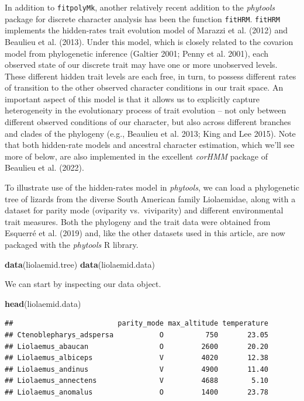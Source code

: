 \documentclass[fleqn,10pt,lineno]{wlpeerj} %
\newenvironment{Shaded}{\begin{snugshade}}{\end{snugshade}}
\newcommand{\FunctionTok}[1]{\textcolor[rgb]{0.13,0.29,0.53}{\textbf{#1}}}
\newcommand{\NormalTok}[1]{#1}
\begin{document}
In addition to \texttt{fitpolyMk}, another relatively recent addition to the \emph{phytools} package for discrete character analysis has been the function \texttt{fitHRM}. \texttt{fitHRM} implements the hidden-rates trait evolution model of Marazzi et al. (2012) and Beaulieu et al. (2013). Under this model, which is closely related to the covarion model from phylogenetic inference (Galtier 2001; Penny et al. 2001), each observed state of our discrete trait may have one or more unobserved levels. These different hidden trait levels are each free, in turn, to possess different rates of transition to the other observed character conditions in our trait space. An important aspect of this model is that it allows us to explicitly capture heterogeneity in the evolutionary process of trait evolution -- not only between different observed conditions of our character, but also across different branches and clades of the phylogeny (e.g., Beaulieu et al. 2013; King and Lee 2015). Note that both hidden-rate models and ancestral character estimation, which we'll see more of below, are also implemented in the excellent \emph{corHMM} package of Beaulieu et al. (2022).

To illustrate use of the hidden-rates model in \emph{phytools}, we can load a phylogenetic tree of lizards from the diverse South American family Liolaemidae, along with a dataset for parity mode (oviparity vs.~viviparity) and different environmental trait measures. Both the phylogeny and the trait data were obtained from Esquerré et al. (2019) and, like the other datasets used in this article, are now packaged with the \emph{phytools} R library.

\begin{Shaded}
\begin{Highlighting}[]
\FunctionTok{data}\NormalTok{(liolaemid.tree)}
\FunctionTok{data}\NormalTok{(liolaemid.data)}
\end{Highlighting}
\end{Shaded}

We can start by inspecting our data object.

\begin{Shaded}
\begin{Highlighting}[]
\FunctionTok{head}\NormalTok{(liolaemid.data)}
\end{Highlighting}
\end{Shaded}

\begin{verbatim}
##                         parity_mode max_altitude temperature
## Ctenoblepharys_adspersa           O          750       23.05
## Liolaemus_abaucan                 O         2600       20.20
## Liolaemus_albiceps                V         4020       12.38
## Liolaemus_andinus                 V         4900       11.40
## Liolaemus_annectens               V         4688        5.10
## Liolaemus_anomalus                O         1400       23.78
\end{verbatim}
\end{document}
